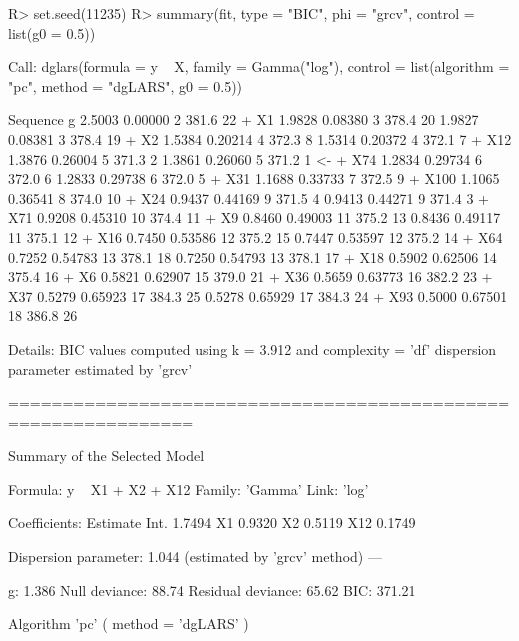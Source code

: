 \begin{example}
R> set.seed(11235)
R> summary(fit, type = "BIC", phi = "grcv", control = list(g0 = 0.5))

Call:  dglars(formula = y ~ X, family = Gamma("log"), control = list(algorithm = "pc", 
    method = "dgLARS", g0 = 0.5))

  Sequence       g     %
            2.5003  0.00000   2  381.6  22   
     + X1                                    
            1.9828  0.08380   3  378.4  20   
            1.9827  0.08381   3  378.4  19   
     + X2                                    
            1.5384  0.20214   4  372.3   8   
            1.5314  0.20372   4  372.1   7   
    + X12                                    
            1.3876  0.26004   5  371.3   2   
            1.3861  0.26060   5  371.2   1 <-
    + X74                                    
            1.2834  0.29734   6  372.0   6   
            1.2833  0.29738   6  372.0   5   
    + X31                                    
            1.1688  0.33733   7  372.5   9   
   + X100                                    
            1.1065  0.36541   8  374.0  10   
    + X24                                    
            0.9437  0.44169   9  371.5   4   
            0.9413  0.44271   9  371.4   3   
    + X71                                    
            0.9208  0.45310  10  374.4  11   
     + X9                                    
            0.8460  0.49003  11  375.2  13   
            0.8436  0.49117  11  375.1  12   
    + X16                                    
            0.7450  0.53586  12  375.2  15   
            0.7447  0.53597  12  375.2  14   
    + X64                                    
            0.7252  0.54783  13  378.1  18   
            0.7250  0.54793  13  378.1  17   
    + X18                                    
            0.5902  0.62506  14  375.4  16   
     + X6                                    
            0.5821  0.62907  15  379.0  21   
    + X36                                    
            0.5659  0.63773  16  382.2  23   
    + X37                                    
            0.5279  0.65923  17  384.3  25   
            0.5278  0.65929  17  384.3  24   
    + X93                                    
            0.5000  0.67501  18  386.8  26   

Details:
	 BIC values computed using k = 3.912 and complexity = 'df'
	 dispersion parameter estimated by 'grcv'

===============================================================

Summary of the Selected Model

    Formula: y ~ X1 + X2 + X12
     Family: 'Gamma'
       Link: 'log'

Coefficients:
     Estimate
Int.   1.7494
X1     0.9320
X2     0.5119
X12    0.1749

Dispersion parameter: 1.044 (estimated by 'grcv' method)
---

                 g: 1.386
     Null deviance:  88.74 
 Residual deviance:  65.62 
               BIC: 371.21 

 Algorithm 'pc' ( method = 'dgLARS' )
\end{example}


